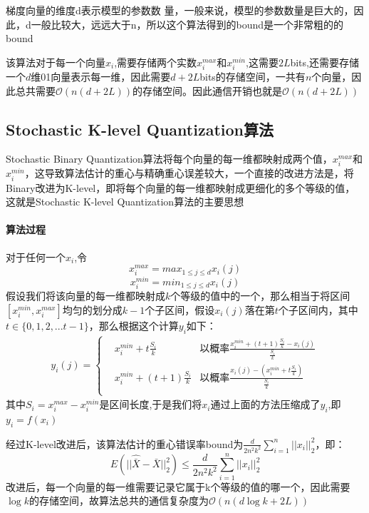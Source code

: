 \documentclass[lang=cn,newtx,10pt,scheme=chinese,chinesefont=nofont,citestyle=gb7714-2015, bibstyle=gb7714-2015]{elegantbook}
\begin{document}
\begin{refsection}
梯度向量的维度d表示模型的参数数 量，一般来说，模型的参数数量是巨大的，因此，d一般比较大，远远大于n，所以这个算法得到的bound是一个非常粗的的bound

该算法对于每一个向量$x_{i}$,需要存储两个实数$x_{i}^{max}$和$x_{i}^{min}$,这需要$2L$bits,还需要存储一个$d$维01向量表示每一维，因此需要$d + 2L$bits的存储空间，一共有$n$个向量，因此总共需要$\mathcal{O}(n(d + 2L))$的存储空间。因此通信开销也就是$\mathcal{O}(n(d + 2L))$
\subsection{Stochastic K-level Quantization算法}
Stochastic Binary Quantization算法将每个向量的每一维都映射成两个值，$x_{i}^{max}$和$x_{i}^{min}$，这导致算法估计的重心与精确重心误差较大，一个直接的改进方法是，将Binary改进为K-level，即将每个向量的每一维都映射成更细化的多个等级的值，这就是Stochastic K-level Quantization算法的主要思想

\paragraph{算法过程} 对于任何一个$x_{i}$,令
\[x_{i}^{max} = max_{1 \leq j \leq d} x_{i}(j)\]
\[x_{i}^{min} = min_{1 \leq j \leq d} x_{i}(j)\]
假设我们将该向量的每一维都映射成$k$个等级的值中的一个，那么相当于将区间$[x_{i}^{min},x_{i}^{max}]$均匀的划分成$k - 1$个子区间，假设$x_{i}(j)$落在第$t$个子区间内，其中$t \in \{0,1,2,...t-1\}$，那么根据这个计算$y_{i}$如下：
\begin{align}
\nonumber
y_{i}(j) = \left\{
\begin{aligned}
\nonumber
&x_{i}^{min} + t\frac{S_{i}}{k}  &\text{以概率}\frac{x_{i}^{min} + (t + 1)\frac{S_{i}}{k} - x_{i}(j)}{\frac{S_{i}}{k}}\\
&x_{i}^{min} + (t + 1)\frac{S_{i}}{k}  &\text{以概率}\frac{x_{i}(j) - (x_{i}^{min} + t\frac{S_{i}}{k})}{\frac{S_{i}}{k}}\\
\end{aligned}
\right.
\end{align}
其中$S_{i} = x_{i}^{max} - x_{i}^{min}$是区间长度,于是我们将$x_{i}$通过上面的方法压缩成了$y_{i}$,即$y_{i} = f(x_{i})$

经过K-level改进后，该算法估计的重心错误率bound为$\frac{d}{2n^2k^2} \sum_{i =1}^{n}||x_{i}||_{2}^2$，即：
\[
E(||\hat{\bar{X}} - \bar{X}||_{2}^2) \leq \frac{d}{2n^2k^2} \sum_{i =1}^{n}||x_{i}||_{2}^2
\]
改进后，每一个向量的每一维需要记录它属于k个等级的值的哪一个，因此需要$\log k$的存储空间，故算法总共的通信复杂度为$\mathcal{O}(n(d\log k + 2L))$


\end{refsection}
\end{document}
